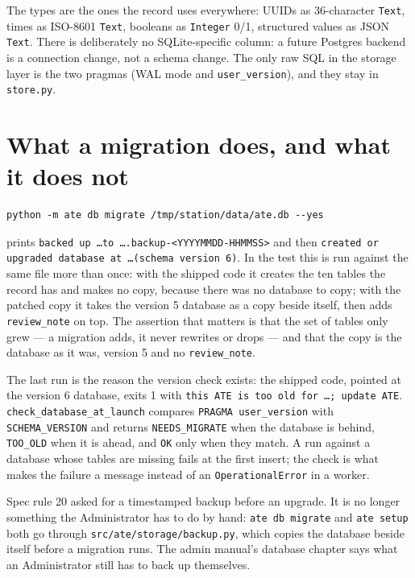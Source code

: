 The types are the ones the record uses everywhere: UUIDs as 36-character \texttt{Text}, times as
ISO-8601 \texttt{Text}, booleans as \texttt{Integer} 0/1, structured values as JSON \texttt{Text}.
There is deliberately no SQLite-specific column: a future Postgres backend is a connection change,
not a schema change. The only raw SQL in the storage layer is the two pragmas (WAL mode and
\texttt{user\_version}), and they stay in \texttt{store.py}.

\section{What a migration does, and what it does not}

\begin{lstlisting}[language=ATEShell]
python -m ate db migrate /tmp/station/data/ate.db --yes
\end{lstlisting}

prints \texttt{backed up \dots to \dots.backup-<YYYYMMDD-HHMMSS>} and then
\texttt{created or upgraded database at \dots (schema version 6)}. In the test this is run against the
same file more than once: with the shipped code it creates the ten tables the record has and makes no
copy, because there was no database to copy; with the patched copy it takes the version 5 database as
a copy beside itself, then adds \texttt{review\_note} on top. The assertion that matters is that the
set of tables only grew --- a migration adds, it never rewrites or drops --- and that the copy is the
database as it was, version 5 and no \texttt{review\_note}.

The last run is the reason the version check exists: the shipped code, pointed at the version 6
database, exits 1 with \texttt{this ATE is too old for \dots; update ATE}. \texttt{check\_\allowbreak{}database\_\allowbreak{}at\_\allowbreak{}launch}
compares \texttt{PRAGMA user\_version} with \texttt{SCHEMA\_VERSION} and returns
\texttt{NEEDS\_MIGRATE} when the database is behind, \texttt{TOO\_OLD} when it is ahead, and
\texttt{OK} only when they match. A run against a database whose tables are missing fails at the
first insert; the check is what makes the failure a message instead of an \texttt{OperationalError}
in a worker.

Spec rule 20 asked for a timestamped backup before an upgrade. It is no longer something the
Administrator has to do by hand: \texttt{ate db migrate} and \texttt{ate setup} both go through
\texttt{src/ate/storage/backup.py}, which copies the database beside itself before a migration runs.
The admin manual's database chapter says what an Administrator still has to back up themselves.

